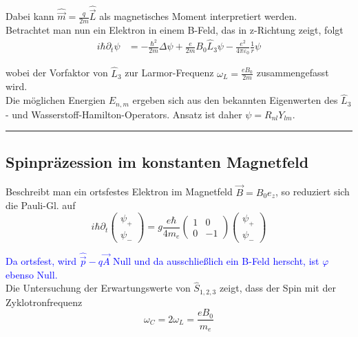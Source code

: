 \documentclass{article}
\begin{document}
{	Dabei kann $\hat{\vec{m}} = \frac{q}{2m}\hat{\vec{L}}$ als magnetisches Moment interpretiert werden.\\
	Betrachtet man nun ein Elektron in einem B-Feld, das in z-Richtung zeigt, folgt
		\begin{align*}
			i\hbar \partial_t \psi &= -\frac{\hbar^2}{2m}\Delta \psi + \frac{e}{2m} B_0\hat{L}_3 \psi - \frac{e^2}{4\pi\varepsilon_0}\frac{1}{r} \psi
		\end{align*}

	wobei der Vorfaktor von $\hat{L}_3$ zur Larmor-Frequenz $\omega_L = \frac{eB_0}{2m}$ zusammengefasst wird.\\
	Die möglichen Energien $E_{n,m}$ ergeben sich aus den bekannten Eigenwerten des $\hat{L}_3$- und Wasserstoff-Hamilton-Operators. Ansatz ist daher $\psi = R_{nl} Y_{lm}$.
\hrule
}


\newpage


\subsection{Spinpräzession im konstanten Magnetfeld}
Beschreibt man ein ortsfestes Elektron im Magnetfeld $\vec{B}=B_0 e_z$, so reduziert sich die Pauli-Gl. auf
	\begin{equation}
		i\hbar\partial_t
		\begin{pmatrix}
			\psi_+ \\ \psi_-
		\end{pmatrix}
		= g \frac{e\hbar}{4m_e}
		\begin{pmatrix}
			1 & 0 \\
			0 & -1
		\end{pmatrix}
		\begin{pmatrix}
			\psi_+ \\ \psi_-
		\end{pmatrix}
	\end{equation}

\textcolor{blue}{Da ortsfest, wird $\hat{\vec{p}} - q\vec{A}$ Null und da ausschließlich ein B-Feld herscht, ist $\varphi$ ebenso Null.}\\
Die Untersuchung der Erwartungswerte von $\hat{S}_{1,2,3}$ zeigt, dass der Spin mit der Zyklotronfrequenz
	\begin{equation}
		\omega_C = 2\omega_L = \frac{e B_0}{m_e}
	\end{equation}

	
\end{document}

